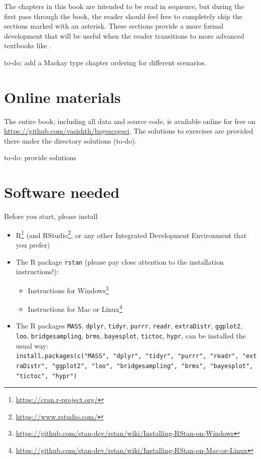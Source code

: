 \documentclass[12pt,]{krantz}
\makeatletter
\providecommand{\tightlist}{%
  \setlength{\itemsep}{0pt}\setlength{\parskip}{0pt}}
\renewcommand{\href}[2]{#2\footnote{\url{#1}}}
\newenvironment{kframe}{%
\medskip{}
\setlength{\fboxsep}{.8em}
 \def\at@end@of@kframe{}%
 \ifinner\ifhmode%
  \def\at@end@of@kframe{\end{minipage}}%
  \begin{minipage}{\columnwidth}%
 \fi\fi%
 \def\FrameCommand##1{\hskip\@totalleftmargin \hskip-\fboxsep
 \colorbox{shadecolor}{##1}\hskip-\fboxsep
     \hskip-\linewidth \hskip-\@totalleftmargin \hskip\columnwidth}%
 \MakeFramed {\advance\hsize-\width
   \@totalleftmargin\z@ \linewidth\hsize
   \@setminipage}}%
 {\par\unskip\endMakeFramed%
 \at@end@of@kframe}
\newenvironment{rmdblock}[1]
  {
  \begin{itemize}
  \renewcommand{\labelitemi}{
    \raisebox{-.7\height}[0pt][0pt]{
      {\setkeys{Gin}{width=3em,keepaspectratio}\texttt{[image: images/\#1]}}
    }
  }
  \setlength{\fboxsep}{1em}
  \begin{kframe}
  \item
  }
  {
  \end{kframe}
  \end{itemize}
  }
\newenvironment{rmdnote}
  {\begin{rmdblock}{note}}
  {\end{rmdblock}}
\theoremstyle{definition}
\theoremstyle{definition}
\theoremstyle{definition}
\theoremstyle{remark}
\makeatother
\begin{document}
The chapters in this book are intended to be read in sequence, but during the first pass through the book, the reader should feel free to completely skip the sections marked with an asterisk. These sections provide a more formal development that will be useful when the reader transitions to more advanced textbooks like \citet{Gelman14}.

\begin{rmdnote}
to-do: add a Mackay type chapter ordering for different scenarios.
\end{rmdnote}

\hypertarget{online-materials}{%
\section{Online materials}\label{online-materials}}

The entire book, including all data and source code, is available online for free on \url{https://github.com/vasishth/bayescogsci}. The solutions to exercises are provided there under the directory solutions (to-do).

\begin{rmdnote}
to-do: provide solutions
\end{rmdnote}

\hypertarget{software-needed}{%
\section{Software needed}\label{software-needed}}

Before you start, please install

\begin{itemize}
\tightlist
\item
  \href{https://cran.r-project.org/}{R} (and \href{https://www.rstudio.com/}{RStudio}, or any other Integrated Development Environment that you prefer)
\item
  The R package \texttt{rstan} (please pay close attention to the installation instructions!):

  \begin{itemize}
  \tightlist
  \item
    \href{https://github.com/stan-dev/rstan/wiki/Installing-RStan-on-Windows}{Instructions for Windows}
  \item
    \href{https://github.com/stan-dev/rstan/wiki/Installing-RStan-on-Mac-or-Linux}{Instructions for Mac or Linux}
  \end{itemize}
\item
  The R packages \texttt{MASS}, \texttt{dplyr}, \texttt{tidyr}, \texttt{purrr}, \texttt{readr}, \texttt{extraDistr}, \texttt{ggplot2}, \texttt{loo}, \texttt{bridgesampling}, \texttt{brms}, \texttt{bayesplot}, \texttt{tictoc}, \texttt{hypr}, can be installed the usual way: \texttt{install.packages(c("MASS",\ "dplyr",\ "tidyr",\ "purrr",\ "readr",\ "extraDistr",\ "ggplot2",\ "loo",\ "bridgesampling",\ "brms",\ "bayesplot",\ "tictoc",\ "hypr")}
\end{itemize}
\end{document}
